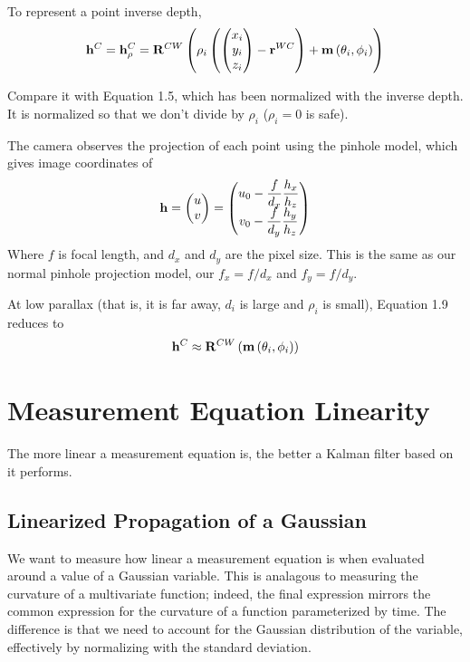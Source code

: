 \documentclass[twoside]{article}
\begin{document}
To represent a point inverse depth,
\begin{equation}
{\bf h}^C={\bf h}^C_{\rho}={\bf R}^{CW}\left(\rho_i\left(\left(\begin{matrix}x_i \cr y_i \cr z_i\end{matrix}\right)-{\bf r}^{WC}\right)+ {\bf m}\left(\theta_i,\phi_i\right)\right) 
\end{equation}

Compare it with Equation 1.5, which has been normalized with the inverse depth. It is normalized so that we don't divide by $\rho_i$ ($\rho_i = 0$ is safe).

The camera observes the projection of each point using the pinhole model, which gives image coordinates of
\begin{equation}
{\bf h}=\left(\begin{matrix}u \cr v\end{matrix}\right)= \left(\begin{matrix}u_0-\displaystyle{f \over d_x}{h_x \over h_z} \cr v_0-\displaystyle{f \over d_y}{h_y \over h_z}\end{matrix}\right)
\end{equation}
Where $f$ is focal length, and $d_x$ and $d_y$ are the pixel size. This is the same as our normal pinhole projection model, our $f_x = f/d_x$ and $f_y = f/d_y$.

At low parallax (that is, it is far away, $d_i$ is large and $\rho_i$ is small), Equation 1.9 reduces to 
\begin{equation}
{\bf h}^C\approx {\bf R}^{CW}\left({\bf m}\left(\theta_i,\phi_i\right)\right) 
\end{equation}

\section{Measurement Equation Linearity}

The more linear a measurement equation is, the better a Kalman filter based on it performs.

\subsection*{Linearized Propagation of a Gaussian}
We want to measure how linear a measurement equation is when evaluated around a value of a Gaussian variable. This is analagous to measuring the curvature of a multivariate function; indeed, the final expression mirrors the common expression for the curvature of a function parameterized by time. The difference is that we need to account for the Gaussian distribution of the variable, effectively by normalizing with the standard deviation.
\end{document}
